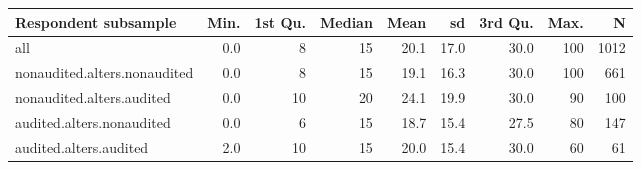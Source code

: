 \begin{table}[ht]
\centering
\begin{tabular}{lrrrrrrrr}
  \hline
Respondent subsample & Min. & 1st Qu. & Median & Mean & sd & 3rd Qu. & Max. & N \\ 
  \hline
all & 0.0 &  8 & 15 & 20.1 & 17.0 & 30.0 & 100 & 1012 \\ 
  nonaudited.alters.nonaudited & 0.0 &  8 & 15 & 19.1 & 16.3 & 30.0 & 100 & 661 \\ 
  nonaudited.alters.audited & 0.0 & 10 & 20 & 24.1 & 19.9 & 30.0 & 90 & 100 \\ 
  audited.alters.nonaudited & 0.0 &  6 & 15 & 18.7 & 15.4 & 27.5 & 80 & 147 \\ 
  audited.alters.audited & 2.0 & 10 & 15 & 20.0 & 15.4 & 30.0 & 60 & 61 \\ 
   \hline
\end{tabular}
\end{table}
